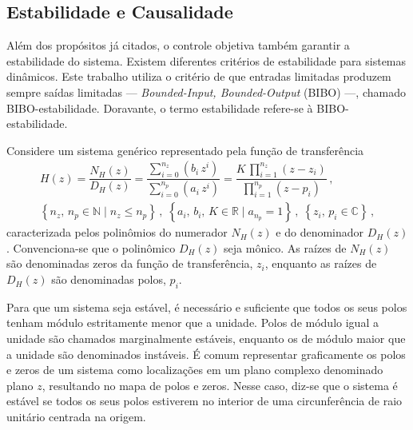 \documentclass[repeatfields,oneside,overleaf]{tcc}
\newcommand{\mycdot}{ \, }
\begin{document}
\subsection{Estabilidade e Causalidade}

Além dos propósitos já citados, o controle objetiva também garantir a estabilidade do sistema.
Existem diferentes critérios de estabilidade para sistemas dinâmicos.
Este trabalho utiliza o critério de que entradas limitadas produzem sempre saídas limitadas --- \textit{Bounded-Input, Bounded-Output} (BIBO) ---, chamado BIBO-estabilidade.
Doravante, o termo estabilidade refere-se à BIBO-estabilidade.

Considere um sistema genérico representado pela função de transferência
\begin{equation}\label{eq:stability_H}
\begin{gathered}
    H(z) = \dfrac{ N_H(z) }{ D_H(z) }
         = \dfrac{ \sum_{i = 0}^{n_z} \left( b_i \mycdot z^i \right) }{ \sum_{i = 0}^{n_p} \left( a_i \mycdot z^i \right) }
         = \dfrac{ K \mycdot \prod_{i = 1}^{n_z} (z - z_i) }{ \prod_{i = 1}^{n_p} (z - p_i) }
        \,,
        \\
        \left\{ n_z,\, n_p \in \mathbb{N} \mid n_z \leq n_p \right\}
        \,,\;
        \left\{ a_i,\, b_i,\, K \in \mathbb{R} \mid a_{n_p} = 1 \right\}
        \,,\;
        \left\{ z_i,\, p_i \in \mathbb{C} \right\}
        \,,
\end{gathered}
\end{equation}
caracterizada pelos polinômios do numerador $N_H(z)$ e do denominador $D_H(z)$.
Con\-ven\-ci\-o\-na\--se que o polinômico $D_H(z)$ seja mônico.
As raízes de $N_H(z)$ são denominadas zeros da função de transferência, $z_i$, enquanto as raízes de $D_H(z)$ são denominadas polos, $p_i$.

Para que um sistema seja estável, é necessário e suficiente que todos os seus polos tenham módulo estritamente menor que a unidade.
Polos de módulo igual a unidade são chamados marginalmente estáveis, enquanto os de módulo maior que a unidade são denominados instáveis.
É comum representar graficamente os polos e zeros de um sistema como localizações em um plano complexo denominado plano $z$, resultando no mapa de polos e zeros.
Nesse caso, diz-se que o sistema é estável se todos os seus polos estiverem no interior de uma circunferência de raio unitário centrada na origem.
\end{document}
